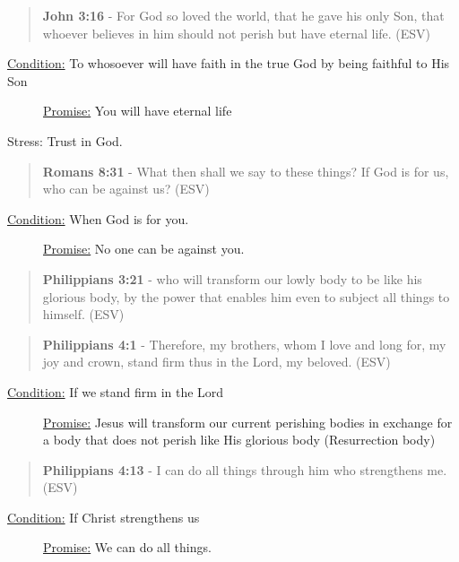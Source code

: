 \documentclass[11pt]{article}
\begin{document}
\begin{quote}
\textbf{John 3:16} - For God so loved the world, that he gave his only Son, that whoever believes in him should not perish but have eternal life. (ESV)
\end{quote}

\begin{description}
\item[{\uline{Condition:} To whosoever will have faith in the true God by being faithful to His Son}] \uline{Promise:} You will have eternal life
\end{description}

Stress: Trust in God.

\begin{quote}
\textbf{Romans 8:31} - What then shall we say to these things? If God is for us, who can be against us? (ESV)
\end{quote}

\begin{description}
\item[{\uline{Condition:} When God is for you.}] \uline{Promise:} No one can be against you.
\end{description}

\begin{quote}
\textbf{Philippians 3:21} - who will transform our lowly body to be like his glorious body, by the power that enables him even to subject all things to himself. (ESV)
\end{quote}

\begin{quote}
\textbf{Philippians 4:1} - Therefore, my brothers, whom I love and long for, my joy and crown, stand firm thus in the Lord, my beloved. (ESV)
\end{quote}

\begin{description}
\item[{\uline{Condition:} If we stand firm in the Lord}] \uline{Promise:} Jesus will transform our current perishing bodies in exchange for a body that does not perish like His glorious body (Resurrection body)
\end{description}

\begin{quote}
\textbf{Philippians 4:13} - I can do all things through him who strengthens me. (ESV)
\end{quote}

\begin{description}
\item[{\uline{Condition:} If Christ strengthens us}] \uline{Promise:} We can do all things.
\end{description}
\end{document}
